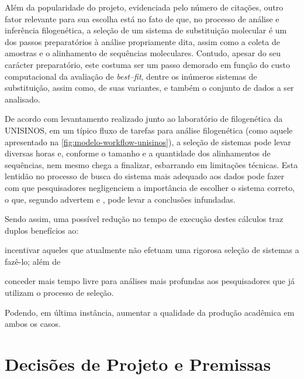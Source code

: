 \documentclass[english,brazilian]{UNISINOSmonografia} %
\begin{document}
Além da popularidade do projeto, evidenciada pelo número de citações, outro fator relevante para sua escolha está no fato de que, no processo de análise e inferência filogenética, a seleção de um sistema de substituição molecular é um dos passos preparatórios à análise propriamente dita, assim como a coleta de amostras e o alinhamento de sequências moleculares.
Contudo, apesar do seu carácter preparatório, este costuma ser um passo demorado em função do custo computacional da avaliação de \textit{best--fit}, dentre os inúmeros sistemas de substituição, assim como, de suas variantes, e também o conjunto de dados a ser analisado.



De acordo com levantamento realizado junto ao laboratório de filogenética da UNISINOS, em um típico fluxo de tarefas para análise filogenética (como aquele apresentado na \autoref{fig:modelo-workflow-unisinos}), a seleção de sistemas pode levar diversas horas e, conforme o tamanho e a quantidade dos alinhamentos de sequências, nem mesmo chega a finalizar, esbarrando em limitações técnicas.
Esta lentidão no processo de busca do sistema mais adequado aos dados pode fazer com que pesquisadores negligenciem a importância de escolher o sistema correto, o que, segundo advertem  e , pode levar a conclusões infundadas.


Sendo assim, uma possível redução no tempo de execução destes cálculos traz duplos benefícios ao: 
\begin{inparaenum} 
	\item incentivar aqueles que atualmente não efetuam uma rigorosa seleção de sistemas a fazê-lo; além de 
	\item conceder mais tempo livre para análises mais profundas aos pesquisadores que já utilizam o processo de seleção.
\end{inparaenum}
Podendo, em última instância, aumentar a qualidade da produção acadêmica em ambos os casos.


\section{Decisões de Projeto e Premissas}
\label{sec:modelo-decisoes}


\end{document}
